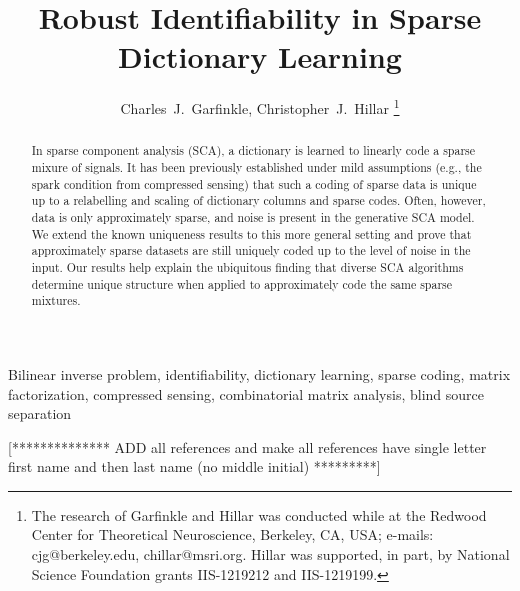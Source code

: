 \documentclass[journal, onecolumn]{IEEEtran}
\begin{document}
\title{Robust Identifiability in Sparse Dictionary Learning}

\author{Charles~J.~Garfinkle,  Christopher~J.~Hillar%
\thanks{The research of Garfinkle and Hillar was conducted while at the Redwood Center for Theoretical Neuroscience, Berkeley, CA, USA; e-mails: cjg@berkeley.edu, chillar@msri.org.  Hillar was supported, in part, by National Science Foundation grants IIS-1219212 and IIS-1219199.}}%

\maketitle

\begin{abstract}
In sparse component analysis (SCA), a dictionary is learned to linearly code a sparse mixure of signals.  It has been previously established  under mild assumptions (e.g., the spark condition from compressed sensing) that such a coding of sparse data is unique up to a relabelling and scaling of dictionary columns and sparse codes.  Often, however, data is only approximately sparse, and noise is present in the generative SCA model.  We extend the known uniqueness results to this more general setting and prove that approximately sparse datasets are still uniquely coded up to the level of noise in the input.  Our results help explain the ubiquitous finding that diverse SCA algorithms determine unique structure when applied to approximately code the same sparse mixtures.
\end{abstract}

\begin{IEEEkeywords}
Bilinear inverse problem, identifiability, dictionary learning, sparse coding, matrix factorization, compressed sensing, combinatorial matrix analysis, blind source separation
\end{IEEEkeywords}


[************** ADD all references and make all references have single letter first name and then last name (no middle initial) *********]
\end{document}
